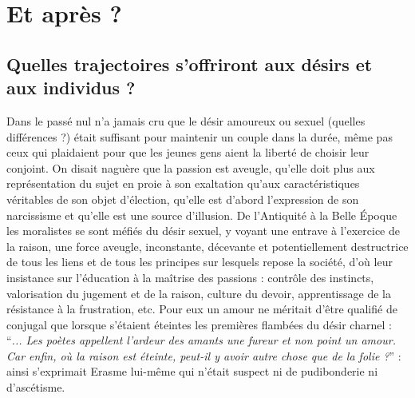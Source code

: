 

\part{Et après ?}

 \chapter{Quelles trajectoires s'offriront aux désirs et aux individus ?}
 

 
 
Dans le passé nul n'a jamais cru que le désir amoureux ou sexuel (quelles différences ?) était suffisant pour maintenir un couple dans la durée, même pas ceux qui plaidaient pour que les jeunes gens aient la liberté de choisir leur conjoint. On disait naguère que la passion est aveugle, qu'elle doit plus aux représentation du sujet en proie à son exaltation qu'aux caractéristiques véritables de son objet d'élection, qu'elle est d'abord l'expression de son narcissisme et qu'elle est une source d'illusion. De l'Antiquité à la Belle Époque les moralistes se sont méfiés du désir sexuel, y voyant une entrave à l'exercice de la raison, une force aveugle, inconstante, décevante et potentiellement destructrice de tous les liens et de tous les principes sur lesquels repose la société, d'où leur insistance sur l'éducation à la maîtrise des passions : contrôle des instincts, valorisation du jugement et de la raison, culture du devoir, apprentissage de la résistance à la frustration, etc. Pour eux un amour ne méritait d'être qualifié de conjugal que lorsque s'étaient éteintes les premières flambées du désir charnel : \enquote{\emph{... Les poètes appellent l'ardeur des amants une fureur et non point un amour. Car enfin, où la raison est éteinte, peut-il y avoir autre chose que de la folie ?}} : ainsi s'exprimait Erasme lui-même qui n'était suspect ni de pudibonderie ni d'ascétisme.



